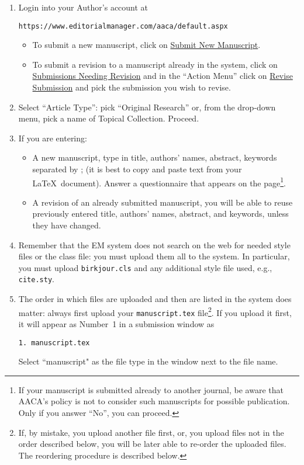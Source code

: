 \documentclass{birkjour}
\theoremstyle{definition}
\theoremstyle{remark}
\numberwithin{equation}{section}
\begin{document}
\begin{enumerate}

\item Login into your Author's account at
      \begin{center} 
      \texttt{https://www.editorialmanager.com/aaca/default.aspx}
			\end{center}
      \begin{itemize}
			\item To submit a new manuscript, click on \underline{Submit New Manuscript}.      
			\item To submit a revision to a manuscript already in the system, click on 
			      \underline{Submissions Needing Revision} and in the ``Action Menu'' click 
						on \underline{Revise Submission} and pick the submission you wish to revise.
			\end{itemize}
\item Select ``Article Type'': pick ``Original Research'' or, from the drop-down menu, pick a name of Topical Collection. Proceed.

\item If you are entering:
\begin{itemize}
\item A new manuscript, type in title, authors' names, abstract, keywords separated by ;	(it is best to copy and paste text from your \LaTeX\ document). Answer a questionnaire that appears on the page\footnote{If your manuscript is submitted already to another journal, be aware that AACA's policy is not to consider such manuscripts for  possible publication. Only if you answer ``No'', you can proceed.}.

\item A revision of an already submitted manuscript, you will be able to reuse previously entered title, authors' names, abstract, and keywords, unless they have changed.
\end{itemize}    

\item Remember that the EM system does not search on the web for needed style files or the class file: you must upload them all to the system. In particular, you must upload \texttt{birkjour.cls} and any additional style file used, e.g., \texttt{cite.sty}.

\item The order in which files are uploaded and then are listed in the system does matter: always first upload your \texttt{manuscript.tex} file\footnote{If, by mistake, you upload another file first, or, you upload files not in the order described below, you will be later able to re-order the uploaded files. The reordering procedure is described below.}. If you upload it first, it will appear as Number~1 in a submission window as
\begin{verbatim}
1. manuscript.tex
\end{verbatim}
Select ``manuscript" as the file type in the window next to the file name.


\end{enumerate}
\end{document}
